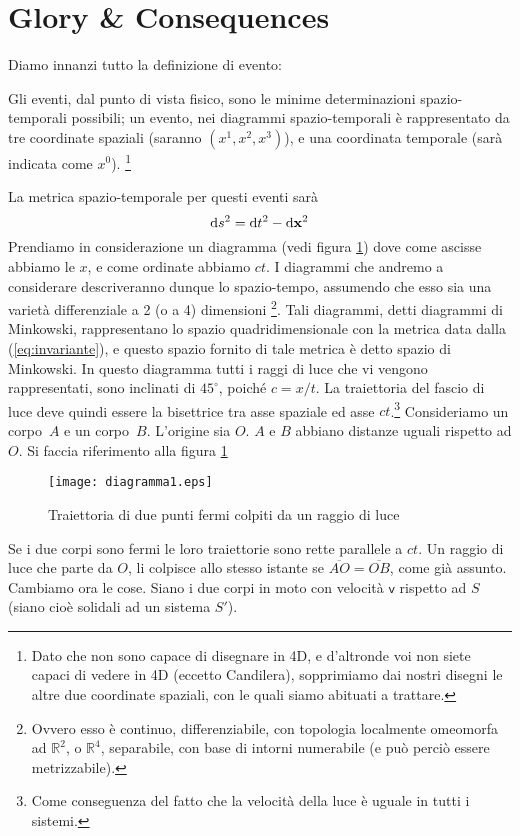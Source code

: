 \section{Glory \& Consequences}
Diamo innanzi tutto la definizione di evento:
\begin{definizione}
  Gli eventi, dal punto di vista fisico, sono le minime determinazioni
  spazio-temporali possibili; un evento, nei diagrammi
  spazio-temporali \`e rappresentato da tre coordinate spaziali
  (saranno $(x^1,x^2,x^3)$), e una coordinata temporale (sar\`a
  indicata come $x^0$).%
  \footnote{Dato che non sono capace di disegnare
    in 4D, e d'altronde voi non siete capaci di vedere in 4D
    (eccetto Candilera), sopprimiamo dai nostri disegni le altre due
    coordinate spaziali, con le quali siamo abituati a trattare.}
\end{definizione}
La metrica spazio-temporale per questi eventi sar\`a
\begin{equation}
  \label{eq:invariante}
  \mathrm{d} s^2 = \mathrm{d} t^2 - \mathrm{d} \mathbf{x}^2
\end{equation}
Prendiamo in considerazione un diagramma (vedi figura
\ref{fig:diagramma1}) dove come ascisse abbiamo le $x$, e come
ordinate abbiamo $ct$. I diagrammi che andremo a considerare
descriveranno dunque lo spazio-tempo, assumendo che esso sia una
variet\`a differenziale a 2 (o a 4) dimensioni \footnote{Ovvero esso
  \`e continuo, differenziabile, con topologia localmente omeomorfa ad
  $\mathbb{R}^2$, o $\mathbb{R}^4$, separabile, con base di intorni
  numerabile (e pu\`o perci\`o essere metrizzabile).}. Tali diagrammi,
detti diagrammi di Minkowski,
rappresentano lo spazio quadridimensionale con la metrica data dalla
(\ref{eq:invariante}), e questo spazio fornito di tale metrica \`e
detto spazio di Minkowski. In questo
diagramma tutti i raggi di luce che vi vengono rappresentati, sono
inclinati di $45^{\circ}$, poich\'e $c = x / t$. La traiettoria del
fascio di luce deve quindi essere la bisettrice tra asse spaziale ed
asse $ct$.\footnote{Come conseguenza del fatto che la velocit\`a della
  luce \`e uguale in tutti i sistemi.} Consideriamo un corpo~$A$ e un
corpo~$B$. L'origine sia $O$. $A$ e $B$ abbiano distanze uguali
rispetto ad $O$. Si faccia riferimento alla figura
\ref{fig:diagramma1}

\begin{figure}[htbp]
  \begin{center}
       
    \texttt{[image: diagramma1.eps]}
    \caption{Traiettoria di due punti fermi colpiti da un raggio di
      luce} \label{fig:diagramma1}
  \end{center}
\end{figure}
Se i due corpi sono fermi le loro traiettorie sono rette parallele a
$ct$. Un raggio di luce che parte da $O$, li colpisce allo stesso
istante se $\overline{AO}=\overline{OB}$, come gi\`a assunto. Cambiamo
ora le cose. Siano i due corpi in moto con velocit\`a
$\mathbf{\mathsf{v}}$ rispetto ad $S$ (siano cio\`e solidali ad un
sistema $S'$). %


